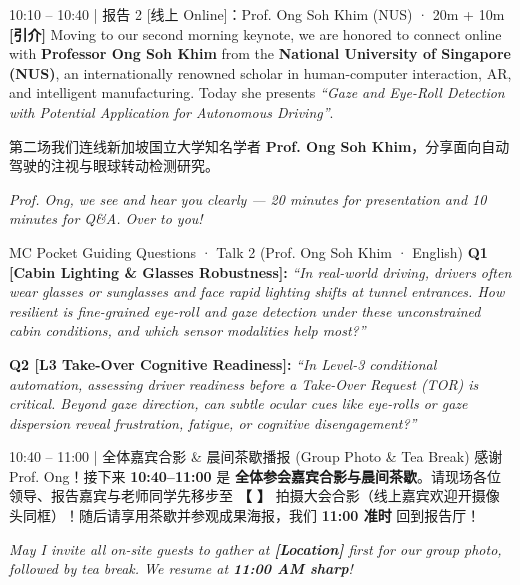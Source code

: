 \documentclass[12pt,a4paper]{article}
\newcommand{\blankline}[1]{%
  \underline{\hspace{#1}}%
}
\begin{document}
\begin{scriptbox}{10:10 – 10:40 \;|\; 报告 2 [线上 Online]：Prof. Ong Soh Khim (NUS) · 20m + 10m}
\fontsize{11.1}{15.8}\selectfont
\textbf{[引介]} Moving to our second morning keynote, we are honored to connect online with \textbf{Professor Ong Soh Khim} from the \textbf{National University of Singapore (NUS)}, an internationally renowned scholar in human-computer interaction, AR, and intelligent manufacturing. Today she presents \textit{``Gaze and Eye-Roll Detection with Potential Application for Autonomous Driving''}.\par
第二场我们连线新加坡国立大学知名学者 \textbf{Prof. Ong Soh Khim}，分享面向自动驾驶的注视与眼球转动检测研究。\par
\textit{Prof. Ong, we see and hear you clearly — 20 minutes for presentation and 10 minutes for Q\&A. Over to you!}
\end{scriptbox}
\begin{qabox}{MC Pocket Guiding Questions · Talk 2 (Prof. Ong Soh Khim · English)}
\fontsize{10.1}{14.2}\selectfont
\textbf{Q1 [Cabin Lighting \& Glasses Robustness]:} \textit{``In real-world driving, drivers often wear glasses or sunglasses and face rapid lighting shifts at tunnel entrances. How resilient is fine-grained eye-roll and gaze detection under these unconstrained cabin conditions, and which sensor modalities help most?''}\par
\textbf{Q2 [L3 Take-Over Cognitive Readiness]:} \textit{``In Level-3 conditional automation, assessing driver readiness before a Take-Over Request (TOR) is critical. Beyond gaze direction, can subtle ocular cues like eye-rolls or gaze dispersion reveal frustration, fatigue, or cognitive disengagement?''}
\end{qabox}

\begin{transbox}{10:40 – 11:00 \;|\; 全体嘉宾合影 \& 晨间茶歇播报 (Group Photo \& Tea Break)}
\fontsize{10.6}{14.8}\selectfont
感谢 Prof. Ong！接下来 \textbf{10:40–11:00} 是 \textbf{全体参会嘉宾合影与晨间茶歇}。请现场各位领导、报告嘉宾与老师同学先移步至 \textbf{【\blankline{42mm}】} 拍摄大会合影（线上嘉宾欢迎开摄像头同框）！随后请享用茶歇并参观成果海报，我们 \textbf{11:00 准时} 回到报告厅！\par
\textit{May I invite all on-site guests to gather at \textbf{[Location]} first for our group photo, followed by tea break. We resume at \textbf{11:00 AM sharp}!}
\end{transbox}

\newpage
\end{document}
